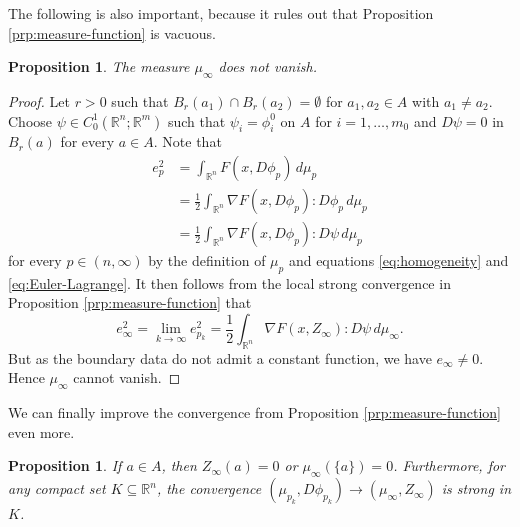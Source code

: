 \documentclass[a4paper]{article}
\newcommand{\R}{\mathbb{R}}
\newcommand{\grad}{\nabla}
\newtheorem{proposition}[theorem]{Proposition}
\theoremstyle{definition}
\theoremstyle{remark}
\begin{document}
The following is also important, because it rules out that Proposition \ref{prp:measure-function} is vacuous.

\begin{proposition} \label{prp:non-zero}
The measure $\mu_\infty$ does not vanish.
\end{proposition}

\begin{proof}
Let $r > 0$ such that $B_r(a_1) \cap B_r(a_2) = \emptyset$ for $a_1, a_2 \in A$
with $a_1 \neq a_2$. Choose $\psi \in C_0^1(\R^n; \R^m)$ such that $\psi_i = \phi_i^0$
on $A$ for $i = 1, \dotsc, m_0$ and $D\psi = 0$ in $B_r(a)$ for every $a \in A$. Note that
\[
\begin{split}
e_p^2 & = \int_{\R^n} F(x, D\phi_p) \, d\mu_p \\
& = \frac{1}{2} \int_{\R^n} \grad F(x, D\phi_p) : D\phi_p \, d\mu_p \\
& = \frac{1}{2} \int_{\R^n} \grad F(x, D\phi_p) : D\psi \, d\mu_p
\end{split}
\] 
for every $p \in (n, \infty)$ by the definition of $\mu_p$ and equations
\eqref{eq:homogeneity} and \eqref{eq:Euler-Lagrange}. It then follows from
the local strong convergence in Proposition \ref{prp:measure-function} that
\[
e_\infty^2 = \lim_{k \to \infty} e_{p_k}^2 = \frac{1}{2} \int_{\R^n} \grad F(x, Z_\infty) : D\psi \, d\mu_\infty.
\]
But as the boundary data do not admit a constant function, we have
$e_\infty \neq 0$. Hence $\mu_\infty$ cannot vanish.
\end{proof}

We can finally improve the convergence from Proposition \ref{prp:measure-function} even more.

\begin{proposition} \label{prp:no-point-masses}
If $a \in A$, then $Z_\infty(a) = 0$ or $\mu_\infty(\{a\}) = 0$. Furthermore, for any compact set $K \subseteq \R^n$,
the convergence $(\mu_{p_k}, D\phi_{p_k}) \to (\mu_\infty, Z_\infty)$ is strong in $K$.
\end{proposition}
\end{document}
